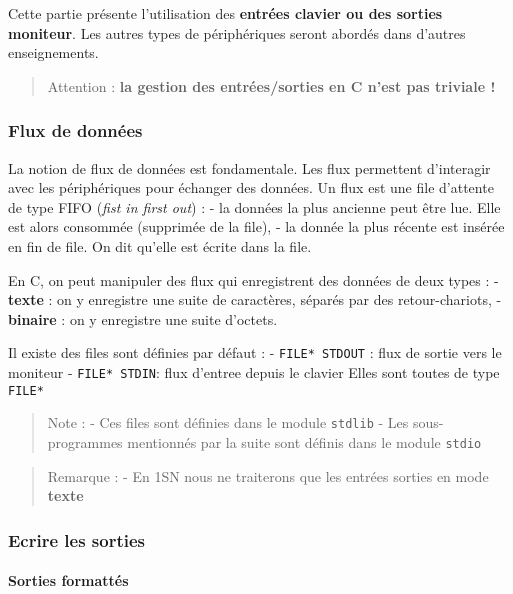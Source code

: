 \documentclass[11pt]{article}
\begin{document}
Cette partie présente l'utilisation des \textbf{entrées clavier ou des
sorties moniteur}. Les autres types de périphériques seront abordés dans
d'autres enseignements.

\begin{quote}
Attention : \textbf{la gestion des entrées/sorties en C n'est pas
triviale !}
\end{quote}

    \hypertarget{flux-de-donnuxe9es}{%
\subsubsection{Flux de données}\label{flux-de-donnuxe9es}}

La notion de flux de données est fondamentale. Les flux permettent
d'interagir avec les périphériques pour échanger des données. Un flux
est une file d'attente de type FIFO (\emph{fist in first out}) : - la
données la plus ancienne peut être lue. Elle est alors consommée
(supprimée de la file), - la donnée la plus récente est insérée en fin
de file. On dit qu'elle est écrite dans la file.

En C, on peut manipuler des flux qui enregistrent des données de deux
types : - \textbf{texte} : on y enregistre une suite de caractères,
séparés par des retour-chariots, - \textbf{binaire} : on y enregistre
une suite d'octets.

Il existe des files sont définies par défaut : - \texttt{FILE*\ STDOUT}
: flux de sortie vers le moniteur - \texttt{FILE*\ STDIN}: flux d'entree
depuis le clavier Elles sont toutes de type \texttt{FILE*}

\begin{quote}
Note : - Ces files sont définies dans le module \texttt{stdlib} - Les
sous-programmes mentionnés par la suite sont définis dans le module
\texttt{stdio}
\end{quote}

\begin{quote}
Remarque : - En 1SN nous ne traiterons que les entrées sorties en mode
\textbf{texte}
\end{quote}

    \hypertarget{ecrire-les-sorties}{%
\subsubsection{Ecrire les sorties}\label{ecrire-les-sorties}}

    \hypertarget{sorties-formattuxe9s}{%
\paragraph{Sorties formattés}\label{sorties-formattuxe9s}}
\end{document}
